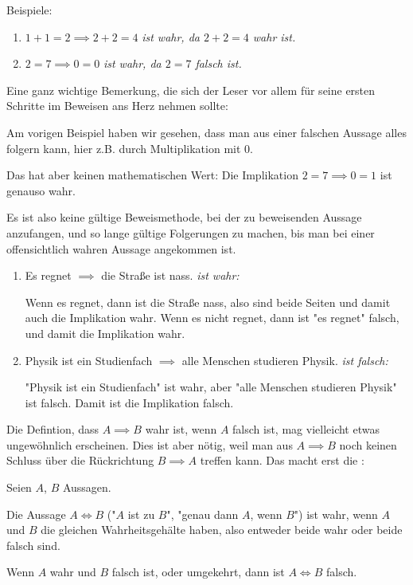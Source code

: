 \begin{example}
    Beispiele:
    \begin{enumerate}
        \item $1 + 1 = 2 \implies 2 + 2 = 4$ \hfill \emph{ist wahr, da $2 +2 = 4$ wahr ist.}
        \item $2 = 7 \implies 0 = 0$ \hfill \emph{ist wahr, da $2 = 7$ falsch ist.}
    \end{enumerate}
    \begin{shadedbox}
        Eine ganz wichtige Bemerkung, die sich der Leser vor allem für seine ersten Schritte im Beweisen ans Herz nehmen sollte:
        
        Am vorigen Beispiel haben wir gesehen, dass man aus einer falschen Aussage alles folgern kann, hier z.B. durch Multiplikation mit $0$.
        
        Das hat aber keinen mathematischen Wert: Die Implikation $2 = 7 \implies 0 = 1$ ist genauso wahr.

        Es ist also keine gültige Beweismethode, bei der zu beweisenden Aussage anzufangen, und so lange gültige Folgerungen zu machen, bis man bei einer offensichtlich wahren Aussage angekommen ist.
    \end{shadedbox}
    \begin{enumerate}[resume]
        \item Es regnet $\implies$ die Straße ist nass. \hfill \emph{ist wahr:}

        Wenn es regnet, dann ist die Straße nass, also sind beide Seiten und damit auch die Implikation wahr. Wenn es nicht regnet, dann ist "es regnet" falsch, und damit die Implikation wahr.
        \item Physik ist ein Studienfach $\implies$ alle Menschen studieren Physik. \hfill \emph{ist falsch:}

        "Physik ist ein Studienfach" ist wahr, aber "alle Menschen studieren Physik" ist falsch. Damit ist die Implikation falsch.
    \end{enumerate}
\end{example}

Die Defintion, dass $A \implies B$ wahr ist, wenn $A$ falsch ist, mag vielleicht etwas ungewöhnlich erscheinen. Dies ist aber nötig, weil man aus $A \implies B$ noch keinen Schluss über die Rückrichtung $B \implies A$ treffen kann. Das macht erst die :

\begin{definition}[Äquivalenz]
    Seien $A$, $B$ Aussagen.

    Die Aussage $A \iff B$ ("$A$ ist  zu $B$", "genau dann $A$, wenn $B$") ist wahr, wenn $A$ und $B$ die gleichen Wahrheitsgehälte haben, also entweder beide wahr oder beide falsch sind.

    Wenn $A$ wahr und $B$ falsch ist, oder umgekehrt, dann ist $A \iff B$ falsch.
\end{definition}

